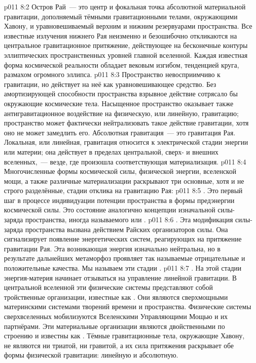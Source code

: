 \vs p011 8:2 Остров Рай~--- это центр и фокальная точка абсолютной материальной гравитации, дополняемый тёмными гравитационными телами, окружающими Хавону, и уравновешиваемый верхним и нижним резервуарами пространства. Все известные излучения нижнего Рая неизменно и безошибочно откликаются на центральное гравитационное притяжение, действующее на бесконечные контуры эллиптических пространственных уровней главной вселенной. Каждая известная форма космической реальности обладает вековым изгибом, тенденцией круга, размахом огромного эллипса.
\vs p011 8:3 Пространство невосприимчиво к гравитации, но действует на неё как уравновешивающее средство. Без амортизирующей способности пространства взрывное действие сотрясало бы окружающие космические тела. Насыщенное пространство оказывает также антигравитационное воздействие на физическую, или линейную, гравитацию; пространство может фактически нейтрализовать такое действие гравитации, хотя оно не может замедлить его. Абсолютная гравитация~--- это гравитация Рая. Локальная, или линейная, гравитация относится к электрической стадии энергии или материи; она действует в пределах центральной, сверх- и внешних вселенных,~--- везде, где произошла соответствующая материализация.
\vs p011 8:4 \pc Многочисленные формы космической силы, физической энергии, вселенской мощи, а также различные материализации раскрывают три основные, хотя и не строго разделённые, стадии отклика на гравитацию Рая:
\vs p011 8:5 . Это первый шаг в процессе индивидуации потенции пространства в формы предэнергии космической силы. Это состояние аналогично концепции изначальной силы\hyp{}заряда пространства, иногда называемого  или .
\vs p011 8:6 . Эта модификация силы\hyp{}заряда пространства вызвана действием Райских организаторов силы. Она сигнализирует появление энергетических систем, реагирующих на притяжение гравитации Рая. Эта возникающая энергия изначально нейтральна, но в результате дальнейших метаморфоз проявляет так называемые отрицательные и положительные качества. Мы называем эти стадии .
\vs p011 8:7 . На этой стадии энергия\hyp{}материя начинает отзываться на управление линейной гравитации. В центральной вселенной эти физические системы представляют собой тройственные организации, известные как . Они являются сверхмощными материнскими системами творений времени и пространства. Физические системы сверхвселенных мобилизуются Вселенскими Управляющими Мощью и их партнёрами. Эти материальные организации являются двойственными по строению и известны как . Тёмные гравитационные тела, окружающие Хавону, не являются ни триатой, ни гравитой, а их сила притяжения раскрывает обе формы физической гравитации: линейную и абсолютную.
